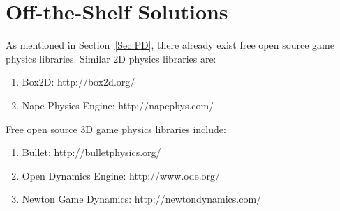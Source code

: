\documentclass[12pt]{article}
\begin{document}
\section{Off-the-Shelf Solutions}
\label{Sec:OS}
As mentioned in Section~\ref{Sec:PD}, there already exist free open source game physics libraries. Similar 2D physics libraries are:
\begin{enumerate}
\item{Box2D: http://box2d.org/}
\item{Nape Physics Engine: http://napephys.com/}
\end{enumerate}
Free open source 3D game physics libraries include:
\begin{enumerate}
\item{Bullet: http://bulletphysics.org/}
\item{Open Dynamics Engine: http://www.ode.org/}
\item{Newton Game Dynamics: http://newtondynamics.com/}
\end{enumerate}
\end{document}
